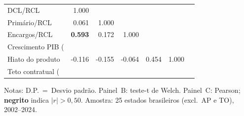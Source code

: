 \begin{table}[htbp]
\begin{tabular}{lrrrrrr}
 \\
\midrule
DCL/RCL & 1.000 &  &  &  &  & 
 \\
Primário/RCL & 0.061 & 1.000 &  &  &  & 
 \\
Encargos/RCL & \textbf{0.593} & 0.172 & 1.000 &  &  & 
 \\
Crescimento PIB (%
 \\
Hiato do produto & -0.116 & -0.155 & -0.064 & 0.454 & 1.000 & 
 \\
Teto contratual (%
 \\
\bottomrule
\end{tabular}
\begin{tablenotes}\small
\item Notas: D.P.~=~Desvio padrão. Painel~B: teste-t de Welch. Painel~C: Pearson; \textbf{negrito} indica $|r|>0{,}50$. Amostra: 25 estados brasileiros (excl.~AP e TO), 2002--2024.
\end{tablenotes}
\end{table}
